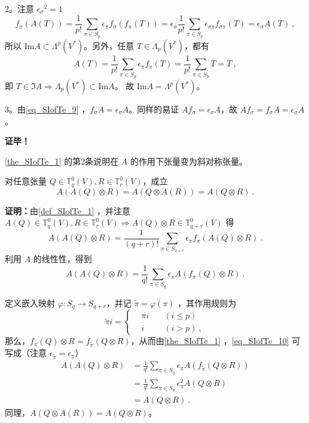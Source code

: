 2。注意 ${\epsilon_\sigma}^2=1$
\begin{equation}\label{eq_SIofTe_9}
f_\sigma(A(T))=\frac{1}{p!}\sum_{\pi\in S_p}\epsilon_\pi f_\sigma(f_\pi(T))=\epsilon_\sigma\frac{1}{p!}\sum_{\pi\in S_p}\epsilon_{\sigma\pi} f_{\sigma\pi}(T)=\epsilon_\sigma A(T)~,
\end{equation}
 所以 $\mathrm{Im} A\subset\Lambda^p(V^*)$。另外，任意 $T\in\Lambda_p(V^*)$，都有
 \begin{equation}\label{eq_SIofTe_11}
 A(T)=\frac{1}{p!}\sum_{\pi\in S_p}\epsilon_\pi f_\pi(T)=\frac{1}{p!}\sum_{\pi\in S_p}T=T~,
 \end{equation}
 即 $T\in \Im A\Rightarrow\Lambda_p(V^*)\subset\mathrm{Im} A$。
 故 $\mathrm{Im} A=\Lambda^p(V^*)$。

3。由\autoref{eq_SIofTe_9} ，$f_\sigma A=\epsilon_\sigma A$。同样的易证 $Af_\sigma=\epsilon_\sigma A$，故 $Af_\sigma=f_\sigma A=\epsilon_\sigma A$。

\textbf{证毕！}

\autoref{the_SIofTe_1} 的第2条说明在 $A$ 的作用下张量变为斜对称张量。

\begin{theorem}{}\label{the_SIofTe_2}
对任意张量 $Q\in\mathbb T_q^0(V),R\in\mathbb T_r^0(V)$，成立
\begin{equation}
A(A(Q)\otimes R)=A(Q\otimes A(R))=A(Q\otimes R)~.
\end{equation}
\end{theorem}
\textbf{证明：}由\autoref{def_SIofTe_1} ，并注意 $A(Q)\in\mathbb T_q^0(V),R\in\mathbb T_r^0(V)\Rightarrow A(Q)\otimes R\in\mathbb T_{q+r}^0(V)$ 得
\begin{equation}
A(A(Q)\otimes R)=\frac{1}{(q+r)!}\sum_{\pi\in S_{q+r}}\epsilon_\pi f_{\pi}(A(Q)\otimes R)~.
\end{equation}
 利用 $A$ 的线性性，得到
 \begin{equation}\label{eq_SIofTe_10}
 A(A(Q)\otimes R)=\frac{1}{q!}\sum_{\pi\in S_q}\epsilon_\pi A(f_{\pi}(Q)\otimes R)~.
 \end{equation}
 
 定义嵌入映射 $\varphi:S_q\rightarrow S_{q+r}$，并记 $\tilde \pi=\varphi(\pi)$ ，其作用规则为
 \begin{equation}
 \tilde\pi i=\left\{\begin{aligned}
 &\pi i\quad &(i\leq p)\\
 &i\quad &(i>p)~,
 \end{aligned}\right.
 \end{equation}
 那么，$f_\pi(Q)\otimes R=f_{\tilde\pi}(Q\otimes R)$，从而由\autoref{the_SIofTe_1} ，\autoref{eq_SIofTe_10} 可写成（注意 $\epsilon_{\tilde\pi}=\epsilon_\pi$）
 \begin{equation}
 \begin{aligned}
 A(A(Q)\otimes R)&=\frac{1}{q!}\sum_{\pi\in S_q}\epsilon_\pi A(f_{\tilde\pi}(Q\otimes R))\\
&=\frac{1}{q!}\sum_{\pi\in S_q}\epsilon_\pi^2 A(Q\otimes R)\\
&=A(Q\otimes R)~.
 \end{aligned}
 \end{equation}
 同理，$A(Q\otimes A(R))=A(Q\otimes R)$。

